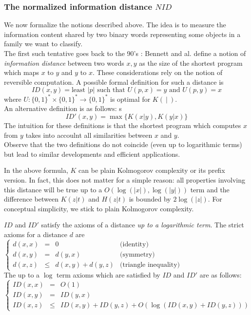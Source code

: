 \subsubsection{The normalized information distance $NID$}
\label{ss:nid}
We now formalize the notions described above.
The idea is to measure the information content shared
by two binary words representing some objects in a family
we want to classify.
\\
The first such tentative goes back to the 90's \cite{bennett}:
Bennett and al. define a notion of {\em information distance}
between two words $x,y$ as the size of the shortest program
which maps $x$ to $y$ and $y$ to $x$.
These considerations rely on the notion of reversible computation.
A possible formal definition for such a distance is
$$
ID(x,y) = \mbox{least $|p|$ such that $U(p,x)=y$ and $U(p,y)=x$}
$$
where $U:{\{0,1\}^*}\times{\{0,1\}^*}\to{\{0,1\}^*}$ is optimal for $K(\ |\ )$.
\medskip\\ 
An alternative definition is as follows: s
$$
ID'(x,y) = \max\{K(x|y),K(y|x)\}
$$
The intuition for these definitions is that the shortest program
which computes $x$ from $y$ takes into accoulnt all similarities
between $x$ and $y$.
\\
Observe that the two definitions do not coincide
(even up to logarithmic terms) but lead to similar
developments and efficient applications.
\begin{note*}
In the above formula, $K$ can be plain Kolmogorov complexity
or its prefix version.
In fact, this does not matter for a simple reason:
all properties involving this distance will be true up to a
$O(\log(|x|),\log(|y|))$ term and the difference between
$K(z|t)$ and $H(z|t)$ is bounded by $2\log(|z|)$.
For conceptual simplicity, we stick to plain Kolmogorov complexity.
\end{note*}
$ID$ and $ID'$ satisfy the axioms of a distance
{\em up to a logarithmic term}.
The strict axioms for a distance $d$ are
\medskip\\\medskip
$\left\{\begin{array}{rcll}
d(x,x)&=&0&\mbox{(identity)}\\
d(x,y)&=&d(y,x)&\mbox{(symmetry)}\\
d(x,z)&\leq&d(x,y)+d(y,z)&\mbox{(triangle inequality)}
\end{array}\right.$
\medskip\\
The up to a $\log$ term axioms which are satisfied by $ID$
and $ID'$ are as follows:
\medskip\\\medskip
$\left\{\begin{array}{rcl}
ID(x,x)&=&O(1)\\
ID(x,y)&=&ID(y,x)\\
ID(x,z)&\leq&ID(x,y)+ID(y,z) + O(\log(ID(x,y)+ID(y,z)))
\end{array}\right.$
